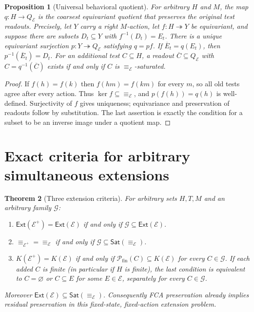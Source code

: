 \documentclass[11pt]{article}
\newtheorem{theorem}{Theorem}[section]
\newtheorem{proposition}[theorem]{Proposition}
\theoremstyle{definition}
\newcommand{\Fin}{\mathcal P_{\mathrm{fin}}}
\newcommand{\Ext}{\mathsf{Ext}}
\newcommand{\Sat}{\mathsf{Sat}}
\begin{document}
\begin{proposition}[Universal behavioral quotient]\label{prop:universal}
For arbitrary $H$ and $M$, the map $q:H\to Q_{\mathcal E}$ is the
coarsest equivariant quotient that preserves the original test readouts.
Precisely, let $Y$ carry a right $M$-action, let $f:H\twoheadrightarrow Y$
be equivariant, and suppose there are subsets $D_t\subseteq Y$ with
$f^{-1}(D_t)=E_t$. There is a unique equivariant surjection
$p:Y\twoheadrightarrow Q_{\mathcal E}$ satisfying $q=p f$.
If $\overline E_t=q(E_t)$, then $p^{-1}(\overline E_t)=D_t$.
For an additional test $C\subseteq H$, a readout
$\overline C\subseteq Q_{\mathcal E}$ with $C=q^{-1}(\overline C)$
exists if and only if $C$ is $\equiv_{\mathcal E}$-saturated.
\end{proposition}
\begin{proof}
If $f(h)=f(k)$ then $f(hm)=f(km)$ for every $m$, so all old tests agree
after every action. Thus $\ker f\subseteq\equiv_{\mathcal E}$, and
$p(f(h))=q(h)$ is well-defined. Surjectivity of $f$ gives uniqueness;
equivariance and preservation of readouts follow by substitution.
The last assertion is exactly the condition for a subset to be an inverse
image under a quotient map.
\end{proof}

\section{Exact criteria for arbitrary simultaneous extensions}

\begin{theorem}[Three extension criteria]\label{thm:criteria}
For arbitrary sets $H,T,M$ and an arbitrary family $\mathcal G$:
\begin{enumerate}[label=(\roman*)]
\item $\Ext(\mathcal E^+)=\Ext(\mathcal E)$ if and only if
      $\mathcal G\subseteq\Ext(\mathcal E)$.
\item $\equiv_{\mathcal E^+}=\equiv_{\mathcal E}$ if and only if
      $\mathcal G\subseteq\Sat(\equiv_{\mathcal E})$.
\item $K(\mathcal E^+)=K(\mathcal E)$ if and only if
      $\Fin(C)\subseteq K(\mathcal E)$ for every $C\in\mathcal G$.
      If each added $C$ is finite (in particular if $H$ is finite), the last condition is equivalent to
      $C=\varnothing$ or $C\subseteq E$ for some $E\in\mathcal E$,
      separately for every $C\in\mathcal G$.
\end{enumerate}
Moreover $\Ext(\mathcal E)\subseteq\Sat(\equiv_{\mathcal E})$.
Consequently FCA preservation already implies residual preservation in this
fixed-state, fixed-action extension problem.
\end{theorem}
\end{document}
